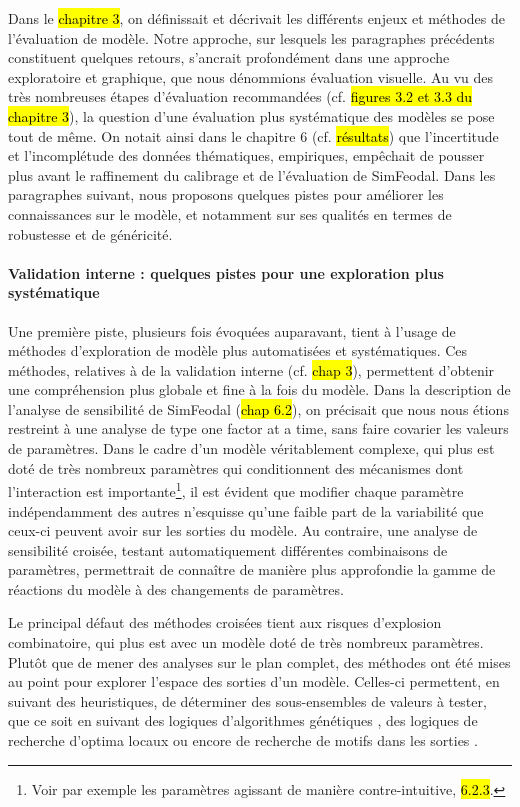 Dans le \hl{chapitre 3}, on définissait et décrivait les différents enjeux et méthodes de l'évaluation de modèle.
Notre approche, sur lesquels les paragraphes précédents constituent quelques retours, s'ancrait profondément dans une approche exploratoire et graphique, que nous dénommions \og évaluation visuelle\fg{}.
Au vu des très nombreuses étapes d'évaluation recommandées (cf. \hl{figures 3.2 et 3.3 du chapitre 3}), la question d'une évaluation plus systématique des modèles se pose tout de même.
On notait ainsi dans le chapitre 6 (cf. \hl{résultats}) que l'incertitude et l'incomplétude des données thématiques, empiriques, empêchait de pousser plus avant le raffinement du calibrage et de l'évaluation de SimFeodal.
Dans les paragraphes suivant, nous proposons quelques pistes pour améliorer les connaissances sur le modèle, et notamment sur ses qualités en termes de robustesse et de généricité.

\paragraph{Validation interne : quelques pistes pour une exploration plus systématique}
Une première piste, plusieurs fois évoquées auparavant, tient à l'usage de méthodes d'exploration de modèle plus automatisées et systématiques.
Ces méthodes, relatives à de la validation interne (cf. \hl{chap 3}), permettent d'obtenir une compréhension plus globale et fine à la fois du modèle.
Dans la description de l'analyse de sensibilité de SimFeodal (\hl{chap 6.2}), on précisait que nous nous étions restreint à une analyse de type \og one factor at a time\fg{}, sans faire covarier les valeurs de paramètres.
Dans le cadre d'un modèle véritablement complexe, qui plus est doté de très nombreux paramètres qui conditionnent des mécanismes dont l'interaction est importante\footnote{
 Voir par exemple les paramètres agissant de manière contre-intuitive, \hl{6.2.3}.
}, il est évident que modifier chaque paramètre indépendamment des autres n'esquisse qu'une faible part de la variabilité que ceux-ci peuvent avoir sur les sorties du modèle.
Au contraire, une analyse de sensibilité croisée, testant automatiquement différentes combinaisons de paramètres, permettrait de connaître de manière plus approfondie la gamme de réactions du modèle à des changements de paramètres.

\noindent Le principal défaut des méthodes croisées tient aux risques d'explosion combinatoire, qui plus est avec un modèle doté de très nombreux paramètres.
Plutôt que de mener des analyses sur le plan complet, des méthodes ont été mises au point pour explorer l'espace des sorties d'un modèle.
Celles-ci permettent, en suivant des heuristiques, de déterminer des sous-ensembles de valeurs à tester, que ce soit en suivant des logiques d'algorithmes génétiques \autocite{schmitt_half_2015,rey-coyrehourcq_plateforme_2015}, des logiques de recherche d'optima locaux \autocite{schmitt_modelisation_2014, reuillon_new_2015} ou encore de recherche de motifs dans les sorties \autocite{cherel_beyond_2015}.

